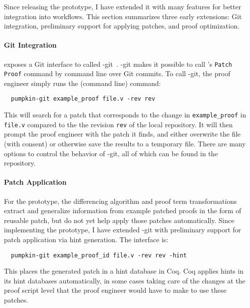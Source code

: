 Since releasing the \sysname prototype, I have extended it with many features
for better integration into  workflows.
This section summarizes three early extensions: Git integration, preliminary support for applying patches,
and proof optimization.

\paragraph{Git Integration} \sysnamelong exposes a Git interface to \sysname
called \sysname-git~\cite{pumpkin-git}.
\sysname-git makes it possible to call \sysname's \lstinline{Patch Proof} command by command line over Git commits.
To call \sysname-git, the proof engineer simply runs the (command line) command:

\begin{lstlisting}
  pumpkin-git example_proof file.v -rev rev
\end{lstlisting}
This will search for a patch that corresponds to the change in \lstinline{example_proof} in \lstinline{file.v} compared to the the revision \lstinline{rev}
of the local repository. It will then prompt the proof engineer with the patch it finds, and either overwrite the file (with consent) 
or otherwise save the results to a temporary file. There are many options to control the behavior of \sysname-git,
all of which can be found in the repository.

\paragraph{Patch Application}
For the \sysname prototype, the differencing algorithm and proof term transformations extract and generalize information from example patched proofs
in the form of reusable patch, but do not yet help apply those patches automatically.
Since implementing the prototype, I have extended \sysname-git with preliminary support for patch application via hint generation.
The interface is: %

\begin{lstlisting}
  pumpkin-git example_proof_id file.v -rev rev -hint
\end{lstlisting}
This places the generated patch in a hint database in Coq.
Coq applies hints in its hint databases automatically, in some cases taking care of the changes at the proof script level
that the proof engineer would have to make to use these patches.

